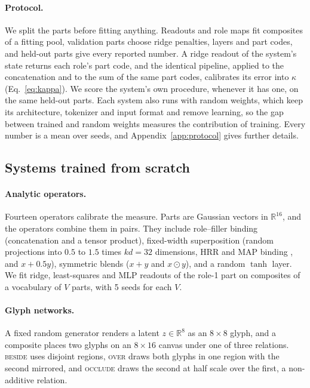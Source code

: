 \documentclass[10pt]{article}
\theoremstyle{plain}
\theoremstyle{remark}
\newcommand{\R}{\mathbb{R}}
\begin{document}
\paragraph{Protocol.} We split the parts before fitting anything. Readouts and role maps fit composites of a fitting pool, validation parts choose ridge penalties, layers and part codes, and held-out parts give every reported number. A ridge readout of the system's state returns each role's part code, and the identical pipeline, applied to the concatenation and to the sum of the same part codes, calibrates its error into $\kappa$ (Eq.~\ref{eq:kappa}). We score the system's own procedure, whenever it has one, on the same held-out parts. Each system also runs with random weights, which keep its architecture, tokenizer and input format and remove learning, so the gap between trained and random weights measures the contribution of training. Every number is a mean over seeds, and Appendix~\ref{app:protocol} gives further details.

\subsection{Systems trained from scratch}
\label{sec:design_scratch}

\paragraph{Analytic operators.} Fourteen operators calibrate the measure. Parts are Gaussian vectors in $\R^{16}$, and the operators combine them in pairs. They include role--filler binding (concatenation and a tensor product), fixed-width superposition (random projections into $0.5$ to $1.5$ times $kd = 32$ dimensions, HRR and MAP binding \citep{plate1995,gayler2006,kanerva2009}, and $x + 0.5y$), symmetric blends ($x + y$ and $x \odot y$), and a random $\tanh$ layer. We fit ridge, least-squares and MLP readouts of the role-1 part on composites of a vocabulary of $V$ parts, with 5 seeds for each $V$.

\paragraph{Glyph networks.} A fixed random generator renders a latent $z \in \R^{8}$ as an $8 \times 8$ glyph, and a composite places two glyphs on an $8 \times 16$ canvas under one of three relations. \textsc{beside} uses disjoint regions, \textsc{over} draws both glyphs in one region with the second mirrored, and \textsc{occlude} draws the second at half scale over the first, a non-additive relation.
\end{document}

